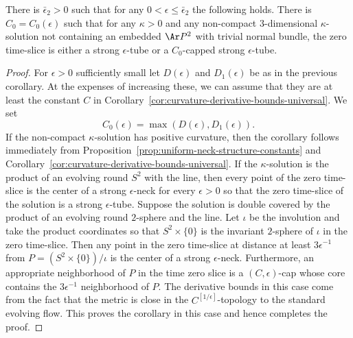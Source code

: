 \begin{corollary}\label{cor:noncompact-kappa-solution-tube-structure}
\label{noncompkappa}
There is $\bar\epsilon_2>0$ such that for any $0<\epsilon\le \bar
\epsilon_2$ the following holds.
 There
is $C_0=C_0(\epsilon)$ such that for any $\kappa>0$ and any non-compact
$3$-dimensional $\kappa$-solution not containing an embedded $\Ar P^2$ with
trivial normal bundle, the zero time-slice is either a strong $\epsilon$-tube
or a $C_0$-capped strong $\epsilon$-tube.
\end{corollary}


\begin{proof}
For $\epsilon>0$ sufficiently small let $D(\epsilon)$ and
$D_1(\epsilon)$ be as in the previous corollary. At the expenses of
increasing these, we can assume that they are at least the constant
$C$ in Corollary~\ref{cor:curvature-derivative-bounds-universal}. We set
$$C_0(\epsilon)=\max(D(\epsilon),D_1(\epsilon)).$$
 If the non-compact $\kappa$-solution has
positive curvature, then the corollary follows immediately from
Proposition~\ref{prop:uniform-neck-structure-constants} and Corollary~\ref{cor:curvature-derivative-bounds-universal}. If the
$\kappa$-solution is the product of an evolving round $S^2$ with the
line, then every point of the zero time-slice is the center of a
strong $\epsilon$-neck for every $\epsilon>0$ so that the zero
time-slice of the solution is a strong $\epsilon$-tube. Suppose the
solution is double covered by the product of an evolving round
$2$-sphere and the line. Let $\iota$ be the involution and take the
product coordinates so that $S^2\times\{0\}$ is the invariant
$2$-sphere of $\iota$ in the zero time-slice. Then any point in the
zero time-slice at distance at least $3\epsilon^{-1}$ from
$P=(S^2\times \{0\})/\iota$ is the center of a strong
$\epsilon$-neck. Furthermore, an appropriate neighborhood of $P$ in
the time zero slice is a $(C,\epsilon)$-cap whose core contains the
$3\epsilon^{-1}$ neighborhood of $P$. The derivative bounds in this
case come from the fact that the metric is close in the
$C^{[1/\epsilon]}$-topology to the standard evolving flow. This
proves the corollary in this case and hence completes the proof.
\end{proof}




